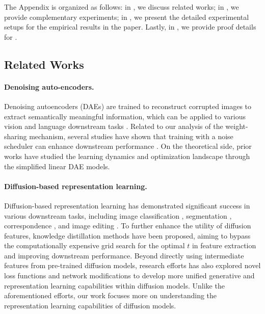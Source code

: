 The Appendix is organized as follows: in , we discuss related works; in , we provide complementary experiments; in , we present the detailed experimental setups for the empirical results in the paper. Lastly, in , we provide proof details for .


\subsection{Related Works}\label{app:related}

\paragraph{Denoising auto-encoders.}
Denoising autoencoders (DAEs) are trained to reconstruct corrupted images to extract semantically meaningful information, which can be applied to various vision \citep{vincent2008extracting, vincent2010stacked} and language downstream tasks \citep{lewis2019bart}. Related to our analysis of the weight-sharing mechanism, several studies have shown that training with a noise scheduler can enhance downstream performance \citep{chandra2014adaptive, geras2014scheduled, zhang2018convolutional}. On the theoretical side, prior works have studied the learning dynamics \citep{pretorius2018learning,steck2020autoencoders} and optimization landscape \citep{kunin2019loss} through the simplified linear DAE models.

\paragraph{Diffusion-based representation learning.} Diffusion-based representation learning \citep{fuest2024diffusion} has demonstrated significant success in various downstream tasks, including image classification \citep{xiang2023denoising, mukhopadhyay2023diffusion, deja2023learning}, segmentation \citep{baranchuk2021label}, correspondence \citep{tang2023emergent}, and image editing \citep{shi2024dragdiffusion}. To further enhance the utility of diffusion features, knowledge distillation \citep{yang2023diffusion, li2023dreamteacher,stracke2024cleandift,luo2024diffusion} methods have been proposed, aiming to bypass the computationally expensive grid search for the optimal $t$ in feature extraction and improving downstream performance. Beyond directly using intermediate features from pre-trained diffusion models, research efforts has also explored novel loss functions \citep{abstreiter2021diffusion, wang2023infodiffusion} and network modifications \citep{hudson2024soda, preechakul2022diffusion} to develop more unified generative and representation learning capabilities within diffusion models. Unlike the aforementioned efforts, our work focuses more on understanding the representation learning capabilities of diffusion models.


